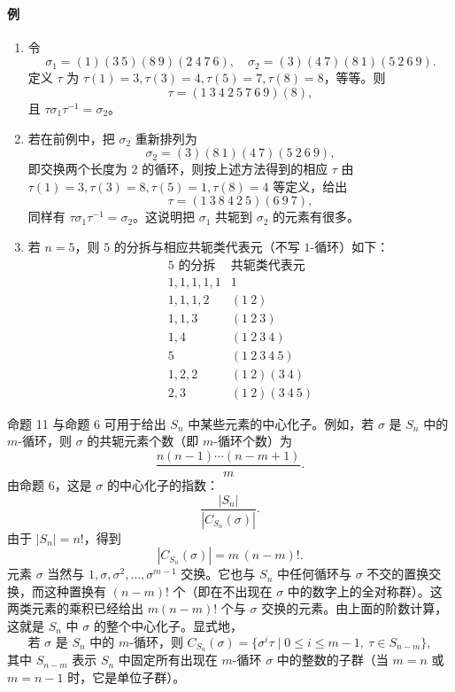 \paragraph{例}
\begin{enumerate}[label=(\arabic*)]
  \item 令
  \[
    \sigma_1=(1)(3\ 5)(8\ 9)(2\ 4\ 7\ 6),
    \quad
    \sigma_2=(3)(4\ 7)(8\ 1)(5\ 2\ 6\ 9).
  \]
  定义 $\tau$ 为 $\tau(1)=3,\tau(3)=4,\tau(5)=7,\tau(8)=8$，等等。则
  \[
    \tau=(1\ 3\ 4\ 2\ 5\ 7\ 6\ 9)(8),
  \]
  且 $\tau\sigma_1\tau^{-1}=\sigma_2$。
  \item 若在前例中，把 $\sigma_2$ 重新排列为
  \[
    \sigma_2=(3)(8\ 1)(4\ 7)(5\ 2\ 6\ 9),
  \]
  即交换两个长度为 $2$ 的循环，则按上述方法得到的相应 $\tau$ 由 $\tau(1)=3,\tau(3)=8,\tau(5)=1,\tau(8)=4$ 等定义，给出
  \[
    \tau=(1\ 3\ 8\ 4\ 2\ 5)(6\ 9\ 7),
  \]
  同样有 $\tau\sigma_1\tau^{-1}=\sigma_2$。这说明把 $\sigma_1$ 共轭到 $\sigma_2$ 的元素有很多。
  \item 若 $n=5$，则 $5$ 的分拆与相应共轭类代表元（不写 $1$-循环）如下：
  \[
  \begin{array}{c|c}
    5\text{ 的分拆} & \text{共轭类代表元}\\ \hline
    1,1,1,1,1 & 1\\
    1,1,1,2 & (1\ 2)\\
    1,1,3 & (1\ 2\ 3)\\
    1,4 & (1\ 2\ 3\ 4)\\
    5 & (1\ 2\ 3\ 4\ 5)\\
    1,2,2 & (1\ 2)(3\ 4)\\
    2,3 & (1\ 2)(3\ 4\ 5)
  \end{array}
  \]
\end{enumerate}

命题 11 与命题 6 可用于给出 $S_n$ 中某些元素的中心化子。例如，若 $\sigma$ 是 $S_n$ 中的 $m$-循环，则 $\sigma$ 的共轭元素个数（即 $m$-循环个数）为
\[
  \frac{n(n-1)\cdots(n-m+1)}{m}.
\]
由命题 6，这是 $\sigma$ 的中心化子的指数：
\[
  \frac{|S_n|}{|C_{S_n}(\sigma)|}.
\]
由于 $|S_n|=n!$，得到
\[
  |C_{S_n}(\sigma)|=m\,(n-m)!.
\]
元素 $\sigma$ 当然与 $1,\sigma,\sigma^2,\ldots,\sigma^{m-1}$ 交换。它也与 $S_n$ 中任何循环与 $\sigma$ 不交的置换交换，而这种置换有 $(n-m)!$ 个（即在不出现在 $\sigma$ 中的数字上的全对称群）。这两类元素的乘积已经给出 $m(n-m)!$ 个与 $\sigma$ 交换的元素。由上面的阶数计算，这就是 $S_n$ 中 $\sigma$ 的整个中心化子。显式地，
\[
  \text{若 }\sigma\text{ 是 }S_n\text{ 中的 }m\text{-循环，则 }
  C_{S_n}(\sigma)=\{\sigma^i\tau\mid 0\leq i\leq m-1,
  \ \tau\in S_{n-m}\},
\]
其中 $S_{n-m}$ 表示 $S_n$ 中固定所有出现在 $m$-循环 $\sigma$ 中的整数的子群（当 $m=n$ 或 $m=n-1$ 时，它是单位子群）。

